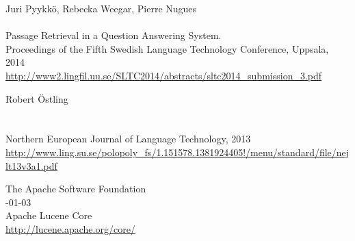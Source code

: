 \documentclass[11pt,letterpaper]{article}
\begin{document}
\begin{thebibliography}{}

\iffalse
\bibitem[\protect\citename{Aho and Ullman}1972]{Aho:72}
Alfred~V. Aho and Jeffrey~D. Ullman.
\newblock 1972.
\newblock {\em The Theory of Parsing, Translation and Compiling}, volume~1.
\newblock Prentice-{Hall}, Englewood Cliffs, NJ.

\bibitem[\protect\citename{{American Psychological Association}}1983]{APA:83}
{American Psychological Association}.
\newblock 1983.
\newblock {\em Publications Manual}.
\newblock American Psychological Association, Washington, DC.

\bibitem[\protect\citename{{Association for Computing Machinery}}1983]{ACM:83}
{Association for Computing Machinery}.
\newblock 1983.
\newblock {\em Computing Reviews}, 24(11):503--512.

\bibitem[\protect\citename{Chandra \bgroup et al.\egroup }1981]{Chandra:81}
Ashok~K. Chandra, Dexter~C. Kozen, and Larry~J. Stockmeyer.
\newblock 1981.
\newblock Alternation.
\newblock {\em Journal of the Association for Computing Machinery},
  28(1):114--133.

\bibitem[\protect\citename{Gusfield}1997]{Gusfield:97}
Dan Gusfield.
\newblock 1997.
\newblock {\em Algorithms on Strings, Trees and Sequences}.
\newblock Cambridge University Press, Cambridge, UK.
\fi

Juri Pyykk\"o, Rebecka Weegar, Pierre Nugues \\
 \\
\newblock Passage Retrieval in a Question Answering System. \\ 
\newblock Proceedings of the Fifth Swedish Language Technology Conference, Uppsala, 2014 \\
\newblock \url{http://www2.lingfil.uu.se/SLTC2014/abstracts/sltc2014_submission_3.pdf}

Robert \"Ostling \\
 \\
 \\
\newblock Northern European Journal of Language Technology, 2013 \\
\newblock \url{http://www.ling.su.se/polopoly_fs/1.151578.1381924405!/menu/standard/file/nejlt13v3a1.pdf}

The Apache Software Foundation \\
-01-03 \\
\newblock Apache Lucene Core \\
\newblock \url{http://lucene.apache.org/core/} \


\end{thebibliography}
\end{document}
